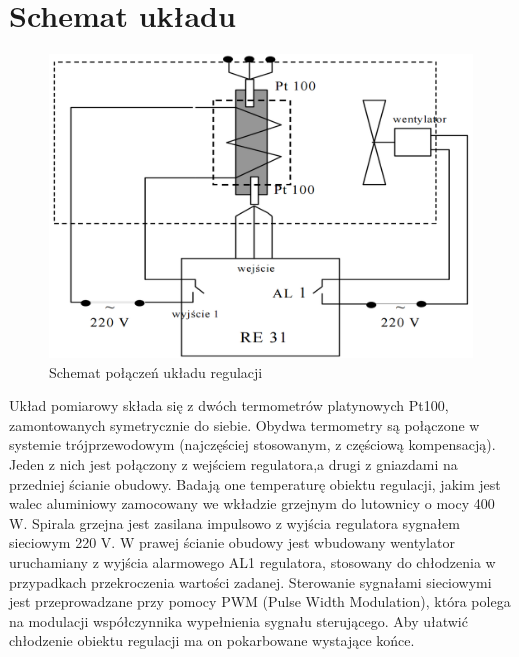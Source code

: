 \documentclass[a4paper, 12pt]{article}
\begin{document}
	\section{Schemat układu}
		\begin{figure}[H]
			\centering
			\includegraphics[width=\textwidth]{./img/schemat.png}
			\caption{Schemat połączeń układu regulacji}
		\end{figure}
		Układ pomiarowy składa się z dwóch termometrów platynowych Pt100, zamontowanych symetrycznie do siebie. Obydwa termometry są połączone w systemie trójprzewodowym (najczęściej stosowanym, z częściową kompensacją). Jeden z nich jest połączony z wejściem regulatora,\linebreak a drugi z gniazdami na przedniej ścianie obudowy. Badają one temperaturę obiektu regulacji, jakim jest walec aluminiowy zamocowany we wkładzie grzejnym do lutownicy o mocy 400 W. Spirala grzejna jest zasilana impulsowo z wyjścia regulatora sygnałem sieciowym 220 V. \linebreak W prawej ścianie obudowy jest wbudowany wentylator uruchamiany z wyjścia alarmowego AL1 regulatora, stosowany do chłodzenia w przypadkach przekroczenia wartości zadanej. Sterowanie sygnałami sieciowymi jest przeprowadzane przy pomocy PWM (Pulse Width Modulation), która polega na modulacji współczynnika wypełnienia sygnału sterującego. Aby ułatwić chłodzenie obiektu regulacji ma on pokarbowane wystające końce.
\end{document}
